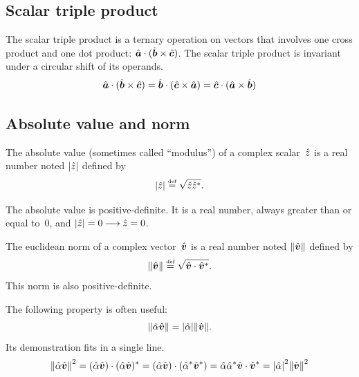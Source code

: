 \subsection{Scalar triple product}

The scalar triple product is a ternary operation on vectors that involves one cross product and one dot product: $\hat{\bm{a}} \cdot (\hat{\bm{b}} \times \hat{\bm{c}})$.
The scalar triple product is invariant under a circular shift of its operands.
\begin{equation}
    \hat{\bm{a}} \cdot (\hat{\bm{b}} \times \hat{\bm{c}})
    =
    \hat{\bm{b}} \cdot (\hat{\bm{c}} \times \hat{\bm{a}})
    =
    \hat{\bm{c}} \cdot (\hat{\bm{a}} \times \hat{\bm{b}})
    \label{eq:scalar_triple_product}
\end{equation}




\subsection{Absolute value and norm}

The absolute value (sometimes called ``modulus'') of a complex scalar~$\hat{z}$ is a real number noted $\abs{\cp{z}}$
defined by
\begin{equation}
    \abs{\cp{z}} \equaldef \sqrt{\cp{z} \cp{z}^*}
    \text{.}
\end{equation}

The absolute value is positive-definite.
It is a real number, always greater than or equal to~$0$,
and $\abs{\cp{z}}=0 \implies \cp{z}=0$.

The euclidean norm of a complex vector~$\hat{\bm{v}}$ is a real number noted $\norm{\vectcp{v}}$ defined by
\begin{equation}
    \norm{\vectcp{v}} \equaldef \sqrt{\vectcp{v} \cdot \vectcp{v}^*}
    \text{.}
\end{equation}
This norm is also positive-definite.

The following property is often useful:
\begin{equation}
    \norm{\cp{\alpha} \vectcp{v}}
    =
    \abs{\cp{\alpha}} \norm{\vectcp{v}}
    \text{.}
\end{equation}
Its demonstration fits in a single line.
\begin{equation}
    \norm{\cp{\alpha} \vectcp{v}}^2
    =
    (\cp{\alpha} \vectcp{v}) \cdot (\cp{\alpha} \vectcp{v})^*
    =
    (\cp{\alpha} \vectcp{v}) \cdot (\cp{\alpha}^* \vectcp{v}^*)
    =
    \cp{\alpha} \cp{\alpha}^* \vectcp{v} \cdot \vectcp{v}^*
    =
    \abs{\cp{\alpha}}^2 \norm{\vectcp{v}}^2
\end{equation}

